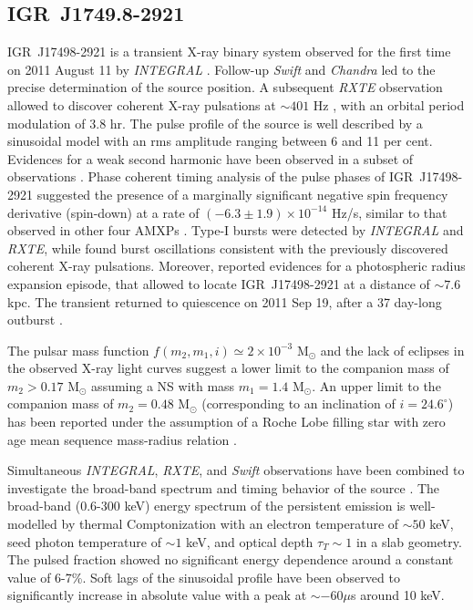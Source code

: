 \documentclass[graybox]{svmult}
\def \inte {{\em INTEGRAL\xspace}}
\def \swift {{\em Swift\xspace}}
\def \chandra {{\em Chandra\xspace}}
\def \rxte {{\em RXTE\xspace}}
\begin{document}
\subsection{IGR~J1749.8-2921}

IGR~J17498-2921 is a transient X-ray binary system observed for the first time on 2011 August 11 by \inte{} \cite{Gibaud2011}. Follow-up \swift{} \cite{Bozzo2011} and \chandra{} \cite{Chakrabarty2011} led to the precise determination of the source position. A subsequent \rxte{} observation allowed to discover coherent X-ray pulsations at $\sim401$ Hz \cite{Papitto2011b}, with an orbital period modulation of 3.8 hr. The pulse profile of the source is well described by a sinusoidal model with an rms amplitude ranging between 6 and 11 per cent. Evidences for a weak second harmonic have been observed in a subset of observations \cite{Papitto2011b}. Phase coherent timing analysis of the pulse phases of IGR~J17498-2921 suggested the presence of a marginally significant negative spin frequency derivative (spin-down) at a rate of $(-6.3\pm1.9)\times10^{-14}$ Hz/s, similar to that observed in other four AMXPs \cite{Galloway2002,Papitto2007,Bult2019c}.
Type-I bursts were detected by \inte{} \cite{Ferrigno2011b} and \rxte{}, while \cite{Linares2011} found burst oscillations consistent with the previously discovered coherent X-ray pulsations. Moreover, \cite{Linares2011} reported evidences for a photospheric radius expansion episode, that allowed to locate IGR~J17498-2921 at a distance of $\sim7.6$ kpc. The transient returned to quiescence on 2011 Sep 19, after a 37 day-long outburst \cite{Linares2011b}.

The pulsar mass function $f(m_2, m_1, i)\simeq 2\times10^{-3}$ M$_\odot$ and the lack of eclipses in the observed X-ray light curves suggest a lower limit to the companion mass of $m_2 > 0.17$ M$_\odot$ assuming a NS with mass $m_1=1.4$ M$_\odot$. An upper limit to the
companion mass of $m_2 = 0.48$ M$_\odot$ (corresponding to an inclination of $i = 24.6^\circ$) has been reported under the assumption of a Roche Lobe filling star with zero age mean sequence mass-radius relation \cite{Papitto2011b}.

Simultaneous \inte{}, \rxte{}, and \swift{} observations have been combined to investigate the broad-band spectrum and timing behavior of the source \cite{Falanga2012}. The broad-band (0.6-300 keV) energy spectrum of the persistent emission is well-modelled by thermal Comptonization with an electron temperature of $\sim50$ keV, seed photon temperature of $\sim1$ keV, and optical depth $\tau_T\sim1$ in a slab geometry. The pulsed fraction showed no significant energy dependence around a constant value of 6-7\%. Soft lags of the sinusoidal profile have been observed to significantly increase in absolute value with a peak at $\sim-60\mu$s around 10 keV.
\end{document}
